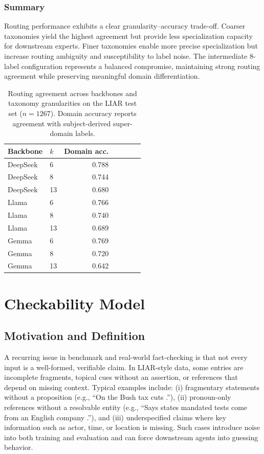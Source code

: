 \subsubsection{Summary}

Routing performance exhibits a clear granularity–accuracy trade-off. Coarser taxonomies yield the highest agreement but provide less specialization capacity for downstream experts. Finer taxonomies enable more precise specialization but increase routing ambiguity and susceptibility to label noise. The intermediate 8-label configuration represents a balanced compromise, maintaining strong routing agreement while preserving meaningful domain differentiation.

\begin{table}[t]
\centering
\caption{Routing agreement across backbones and taxonomy granularities on the LIAR test set ($n = 1267$). Domain accuracy reports agreement with subject-derived super-domain labels.}
\label{tab:main_results}
\begin{tabular}{llrrrrr}
\hline
Backbone & $k$ & Domain acc. \\
\hline
DeepSeek & 6  & 0.788 \\
DeepSeek & 8  & 0.744 \\
DeepSeek & 13 & 0.680 \\
\hline
Llama    & 6  & 0.766 \\
Llama    & 8  & 0.740 \\
Llama    & 13 & 0.689 \\
\hline
Gemma    & 6  & 0.769 \\
Gemma    & 8  & 0.720 \\
Gemma    & 13 & 0.642 \\
\hline
\end{tabular}
\end{table}

\FloatBarrier

\section{Checkability Model}

\subsection{Motivation and Definition}
A recurring issue in benchmark and real-world fact-checking is that not every input is a well-formed, verifiable claim.
In LIAR-style data, some entries are incomplete fragments, topical cues without an assertion, or references that depend on missing context.
Typical examples include: (i) fragmentary statements without a proposition (e.g., ``On the Bush tax cuts .''), (ii) pronoun-only references without a resolvable entity (e.g., ``Says states mandated tests come from an English company .''), and (iii) underspecified claims where key information such as actor, time, or location is missing.
Such cases introduce noise into both training and evaluation and can force downstream agents into guessing behavior.

